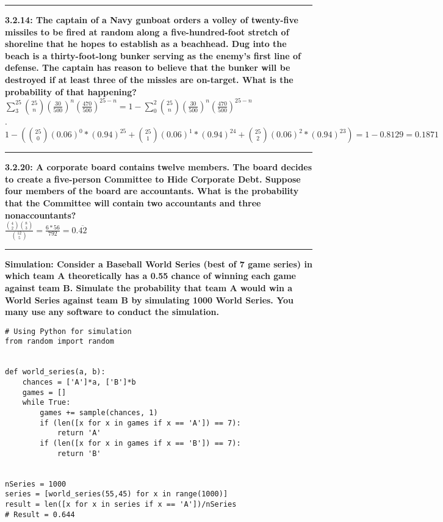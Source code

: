 \documentclass[11pt]{article}
\newcommand\question[2]{\vspace{.25in}\hrule\textbf{#1: #2}}
\begin{document}
\question{3.2.14}{The captain of a Navy gunboat orders a volley of twenty-five
missiles to be fired at random along a five-hundred-foot stretch of shoreline that
he hopes to establish as a beachhead. Dug into the beach is a thirty-foot-long
bunker serving as the enemy's first line of defense. The captain has reason to
believe that the bunker will be destroyed if at least three of the missles are
on-target. What is the probability of that happening?} \\
$\sum_{3}^{25}\binom{25}{n}(\frac{30}{500})^{n} (\frac{470}{500})^{25-n} =
1-\sum_{0}^{2}\binom{25}{n}(\frac{30}{500})^{n} (\frac{470}{500})^{25-n}$ 
\\ .\\
$ 1- (
\binom{25}{0} (0.06)^{0} * (0.94)^{25} +
\binom{25}{1} (0.06)^{1} * (0.94)^{24} +
\binom{25}{2} (0.06)^{2} * (0.94)^{23})
= 1 - 0.8129 = 0.1871
$

\question{3.2.20}{A corporate board contains twelve members. The board decides
to create a five-person Committee to Hide Corporate Debt. Suppose four members
of the board are accountants. What is the probability that the Committee will
contain two accountants and three nonaccountants?}\\
$\frac{\binom{4}{2} \binom{8}{3}}{\binom{12}{5}} = 
\frac{6*56}{792} = 0.\overline{42}$

\question{Simulation}{Consider a Baseball World Series (best of 7 game series) in which team A theoretically
    has a 0.55 chance of winning each game against team B. Simulate the probability that team A
    would win a World Series against team B by simulating 1000 World Series. You many use any
software to conduct the simulation. }

\begin{lstlisting}
# Using Python for simulation
from random import random


def world_series(a, b):
    chances = ['A']*a, ['B']*b
    games = []
    while True:
        games += sample(chances, 1)
        if (len([x for x in games if x == 'A']) == 7):
            return 'A'
        if (len([x for x in games if x == 'B']) == 7):
            return 'B'


nSeries = 1000
series = [world_series(55,45) for x in range(1000)]
result = len([x for x in series if x == 'A'])/nSeries
# Result = 0.644
\end{lstlisting}
\end{document}
